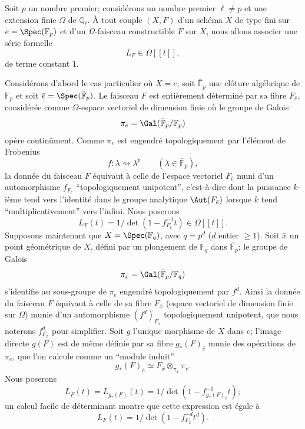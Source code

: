 Soit $p$ un nombre premier; considérons un nombre premier $\ell\ne p$ et une extension finie $\Omega$ de $\mathbb{Q}_\ell$. À tout couple $(X,F)$ d'un schéma $X$ de type fini sur $e=\Spec(\mathbb{F}_p)$ et d'un $\Omega$-faisceau constructible $F$ sur $X$, nous allons associer une série formelle
\[
L_F\in\Omega[[t]],
\]
de terme constant $1$.


Considérons d'abord le cas particulier où $X=e$; soit $\bar{\mathbb{F}}_p$ une clôture algébrique de $\mathbb{F}_p$ et soit $\bar e=\Spec(\bar{\mathbb{F}}_p)$. Le faisceau $F$ est entièrement déterminé par sa fibre $F_{\bar e}$, considérée comme $\Omega$-espace vectoriel de dimension finie où le groupe de Galois
\[
\pi_e=\Gal(\bar{\mathbb{F}}_p/\mathbb{F}_p)
\]
opère continûment. Comme $\pi_e$ est engendré topologiquement par l'élément de Frobenius
\[
f: \lambda\rightsquigarrow \lambda^p\qquad(\lambda\in\bar{\mathbb{F}}_p),
\]
la donnée du faisceau $F$ équivaut à celle de l'espace vectoriel $F_{\bar e}$ muni d'un automorphisme $f_{F_{\bar e}}$ ``topologiquement unipotent'', c'est-à-dire dont la puissance $k$-ième tend vers l'identité dans le groupe analytique $\Aut(F_{\bar e})$ lorsque $k$ tend ``multiplicativement'' vers l'infini. Nous poserons
\[
L_F(t)=1/\det(1-f_{F_{\bar e}}^{-1}t)\in\Omega[[t]].
\]
Supposons maintenant que $X=\Spec(\mathbb{F}_q)$, avec $q=p^d$ ($d$ entier $\ge1$). Soit $\bar x$ un point géométrique de $X$, défini par un plongement de $\mathbb{F}_q$ dans $\bar{\mathbb{F}}_p$; le groupe de Galois
\[
\pi_x=\Gal(\bar{\mathbb{F}}_p/\mathbb{F}_q)
\]
s'identifie au sous-groupe de $\pi_e$ engendré topologiquement par $f^d$. Ainsi la donnée du faisceau $F$ équivaut à celle de sa fibre $F_{\bar x}$ (espace vectoriel de dimension finie sur $\Omega$) munie d'un automorphisme $(f^d)_{F_{\bar x}}$ topologiquement unipotent, que nous noterons $f^d_{F_{\bar x}}$ pour simplifier. Soit $g$ l'unique morphisme de $X$ dans $e$; l'image directe $g(F)$ est de même définie par sa fibre $g_*(F)_{\bar e}$ munie des opérations de $\pi_e$, que l'on calcule comme un ``module induit''
\[
g_*(F)_{\bar e}\simeq F_{\bar x}\otimes_{\pi_x}\pi_e.
\]
Nous poserons
\[
L_F(t)=L_{g_*(F)}(t)=1/\det(1-f^{-1}_{g_*(F)_{\bar e}}t);
\]
un calcul facile de déterminant montre que cette expression est égale 
à
\[
L_F(t)=1/\det(1-f^{-d}_{F_{\bar x}}t^d).
\]

